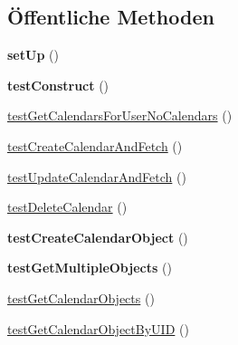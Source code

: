 \subsection*{Öffentliche Methoden}
\begin{DoxyCompactItemize}
\item 
\mbox{\label{class_sabre_1_1_cal_d_a_v_1_1_backend_1_1_simple_p_d_o_test_adc19e7a367b94b240e380379ed2c3589}} 
{\bfseries set\+Up} ()
\item 
\mbox{\label{class_sabre_1_1_cal_d_a_v_1_1_backend_1_1_simple_p_d_o_test_ad64248b9cd1dd2edd19c03ec7078ab7e}} 
{\bfseries test\+Construct} ()
\item 
\mbox{\hyperlink{class_sabre_1_1_cal_d_a_v_1_1_backend_1_1_simple_p_d_o_test_a1a048ebf9389a650eb04cd840890290b}{test\+Get\+Calendars\+For\+User\+No\+Calendars}} ()
\item 
\mbox{\hyperlink{class_sabre_1_1_cal_d_a_v_1_1_backend_1_1_simple_p_d_o_test_afdcb09c24aada8a81f9d119da3005b5a}{test\+Create\+Calendar\+And\+Fetch}} ()
\item 
\mbox{\hyperlink{class_sabre_1_1_cal_d_a_v_1_1_backend_1_1_simple_p_d_o_test_a8d12682ec934d07e138dc7f2577c23f0}{test\+Update\+Calendar\+And\+Fetch}} ()
\item 
\mbox{\hyperlink{class_sabre_1_1_cal_d_a_v_1_1_backend_1_1_simple_p_d_o_test_a3fd6087dbf874b9e050285efc35fc483}{test\+Delete\+Calendar}} ()
\item 
\mbox{\label{class_sabre_1_1_cal_d_a_v_1_1_backend_1_1_simple_p_d_o_test_aaa58c40b91ef04be3acfdd025f2d8fa2}} 
{\bfseries test\+Create\+Calendar\+Object} ()
\item 
\mbox{\label{class_sabre_1_1_cal_d_a_v_1_1_backend_1_1_simple_p_d_o_test_aad63362706b764d7d1c5f73d279bb0bb}} 
{\bfseries test\+Get\+Multiple\+Objects} ()
\item 
\mbox{\hyperlink{class_sabre_1_1_cal_d_a_v_1_1_backend_1_1_simple_p_d_o_test_a47d9db8b6d50252405e89879110e6726}{test\+Get\+Calendar\+Objects}} ()
\item 
\mbox{\hyperlink{class_sabre_1_1_cal_d_a_v_1_1_backend_1_1_simple_p_d_o_test_adc4368b584dd688e6bc2724227e27e08}{test\+Get\+Calendar\+Object\+By\+U\+ID}} ()

\end{DoxyCompactItemize}
